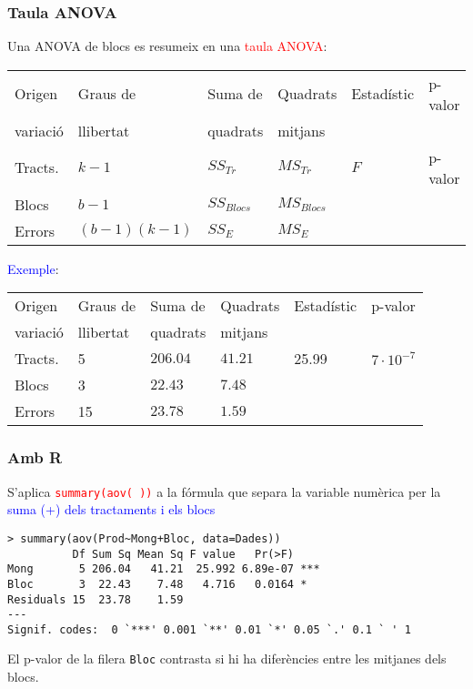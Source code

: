 \documentclass[12pt,t]{beamer}
\newcommand{\red}[1]{\textcolor{red}{#1}}
\newcommand{\blue}[1]{\textcolor{blue}{#1}}
\theoremstyle{plain}
\theoremstyle{definition}
\begin{document}
\begin{frame}
\frametitle{Taula ANOVA}

Una ANOVA de blocs es resumeix en una \red{taula ANOVA}:
\begin{center}
\small \begin{tabular}{llllll}
\hline
Origen&Graus de&Suma de&Quadrats&Estadístic & p-valor\\
variació&llibertat&quadrats&mitjans& & \\\hline
Tracts.&$k-1$ & $SS_{Tr}$&$MS_{Tr}$&$F$ & p-valor\\[2ex]
Blocs &$b-1$&$SS_{Blocs}$&$MS_{Blocs}$& &\\[2ex]
Errors&$(b-1)(k-1)$&$SS_{E}$&$MS_E$& &\\
\hline
\end{tabular}
\end{center}
\pause\medskip

\blue{Exemple}:

\begin{center}
\small 
\small \begin{tabular}{llllll}
\hline
Origen&Graus de&Suma de&Quadrats&Estadístic & p-valor\\
variació&llibertat&quadrats&mitjans& & \\\hline
Tracts.& 5 & $206.04$&$41.21$& 25.99 &  $7\cdot 10^{-7}$\\[2ex]
Blocs& 3 &$22.43$&$7.48$& &\\[2ex]
Errors& 15 &$23.78$&$1.59$& &\\
\hline
\end{tabular}
\end{center}

\end{frame}



\begin{frame}[fragile]
\frametitle{Amb R}

S'aplica \red{\texttt{summary(aov(\ ))}} a la fórmula que separa la variable numèrica per la \blue{suma (+) dels tractaments i els blocs}\medskip

 
\begin{lstlisting}
> summary(aov(Prod~Mong+Bloc, data=Dades))
          Df Sum Sq Mean Sq F value   Pr(>F)    
Mong       5 206.04   41.21  25.992 6.89e-07 ***
Bloc       3  22.43    7.48   4.716   0.0164 *  
Residuals 15  23.78    1.59                     
---
Signif. codes:  0 `***' 0.001 `**' 0.01 `*' 0.05 `.' 0.1 ` ' 1
\end{lstlisting}

El p-valor de la filera \texttt{Bloc} contrasta si hi ha diferències entre les mitjanes dels blocs.
\end{frame}
\end{document}
